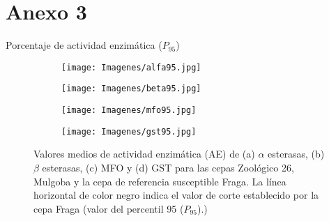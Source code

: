 \section *{Anexo 3} \label{ane3}
\begin{center}
	{\Large Porcentaje de actividad enzimática ($P_{95}$)}
\end{center}
\medskip
\medskip
\medskip
\medskip
\begin{figure}[h]
\begin{subfigure}{.5\textwidth}
	\centering
	\texttt{[image: Imagenes/alfa95.jpg]}
	\caption{}
	\label{alfa95}
\end{subfigure}
\begin{subfigure}{.5\textwidth}
	\centering
	\texttt{[image: Imagenes/beta95.jpg]}
	\caption{}
	\label{beta95}
\end{subfigure}
\par\bigskip
\begin{subfigure}{.5\textwidth}
	\centering
	\texttt{[image: Imagenes/mfo95.jpg]}
	\caption{}
	\label{mfo95}
\end{subfigure}
\begin{subfigure}{.5\textwidth}
	\centering
	\texttt{[image: Imagenes/gst95.jpg]}
	\caption{}
	\label{gst95}
\end{subfigure}
\caption{Valores medios de actividad enzimática (AE) de (a) $\alpha$ esterasas, (b) $\beta$ esterasas, (c) MFO  y (d) GST para las cepas Zoológico 26,  Mulgoba y la cepa de referencia susceptible Fraga. La línea horizontal de color negro indica el valor de corte establecido por la cepa Fraga (valor del percentil 95 ($P_{95}$).)}
\label{figura:95}
\end{figure}